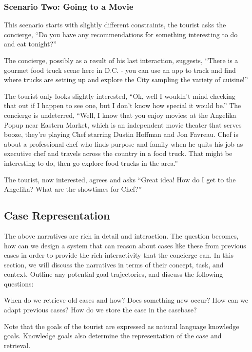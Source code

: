 \subsubsection{Scenario Two: Going to a Movie}

This scenario starts with slightly different constraints, the tourist asks the concierge, “Do you have any recommendations for something interesting to do and eat tonight?”

The concierge, possibly as a result of his last interaction, suggests, “There is a gourmet food truck scene here in D.C. - you can use an app to track and find where trucks are setting up and explore the City sampling the variety of cuisine!”

The tourist only looks slightly interested, “Ok, well I wouldn’t mind checking that out if I happen to see one, but I don’t know how special it would be.”
The concierge is undeterred, “Well, I know that you enjoy movies; at the Angelika Popup near Eastern Market, which is an independent movie theater that serves booze, they’re playing Chef starring Dustin Hoffman and Jon Favreau. Chef is about a professional chef who finds purpose and family when he quits his job as executive chef and travels across the country in a food truck. That might be interesting to do, then go explore food trucks in the area.”

The tourist, now interested, agrees and asks “Great idea! How do I get to the Angelika? What are the showtimes for Chef?”

\subsection{Case Representation}

The above narratives are rich in detail and interaction. The question becomes, how can we design a system that can reason about cases like these from previous cases in order to provide the rich interactivity that the concierge can. In this section, we will discuss the narratives in terms of their concept, task, and context. Outline any potential goal trajectories, and discuss the following questions:

When do we retrieve old cases and how?
Does something new occur? How can we adapt previous cases?
How do we store the case in the casebase?

Note that the goals of the tourist are expressed as natural language knowledge goals. Knowledge goals also determine the representation of the case and retrieval.

